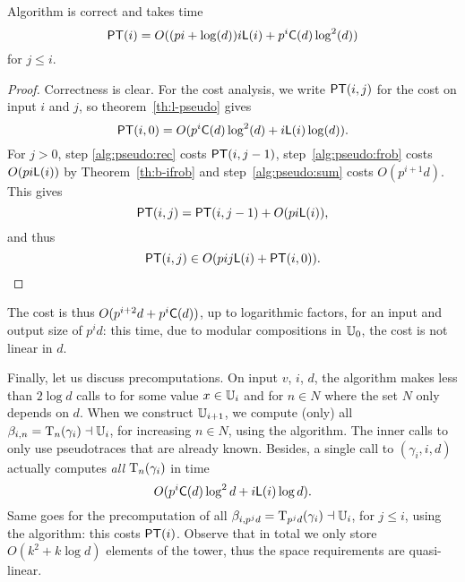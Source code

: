 \begin{theorem}
  \label{th:b-pseudo}
  Algorithm  is correct and takes time
  \begin{equation}
    \label{eq:97}
    \mathsf{PT}(i)=O((pi+\log (d))i\mathsf{L}(i)+p^i\mathsf{C}(d)\log^2 (d))    
  \end{equation}
  for $j \le
  i$.
\end{theorem}
\begin{proof}
  Correctness is clear. For the cost analysis, we write $\mathsf{PT}(i,j)$
  for the cost on input $i$ and $j$, so theorem~\ref{th:l-pseudo}
  gives 
  \begin{equation}
    \label{eq:101}
    \mathsf{PT}(i,0)=O(p^i\mathsf{C}(d)\log^2 (d) + i \mathsf{L}(i)\log(d))
    \text{.} 
  \end{equation}
  For $j>0$, step \ref{alg:pseudo:rec} costs $\mathsf{PT}(i,j-1)$,
  step~\ref{alg:pseudo:frob} costs $O(p i \mathsf{L}(i))$ by
  Theorem~\ref{th:b-ifrob} and step~\ref{alg:pseudo:sum} costs
  $O(p^{i+1}d)$. This gives 
  \begin{equation}
    \label{eq:102}
    \mathsf{PT}(i,j) = \mathsf{PT}(i,j-1) +O(p i \mathsf{L}(i))
    \text{,}
  \end{equation}
  and thus 
  \begin{equation}
    \label{eq:103}
    \mathsf{PT}(i,j) \in O(pij{\sf L}(i) + \mathsf{PT}(i,0))
    \text{.}
  \end{equation}
\end{proof}

The cost is thus $O(p^{i+2}d+p^i\mathsf{C}(d))$, up to logarithmic
factors, for an input and output size of $p^id$: this time, due to
modular compositions in $\mathbb{U}_0$, the cost is not linear in $d$.

Finally, let us discuss precomputations. On input $v$, $i$, $d$, the
algorithm  makes less than $2\log d$ calls to
 for some value $x\in\mathbb{U}_i$ and for
$n\in N$ where the set $N$ only depends on $d$. When we construct
$\mathbb{U}_{i+1}$, we compute (only) all $\beta_{i,n}=\operatorname{T}_{n}(\gamma_i)
\dashv\mathbb{U}_i$, for increasing $n\in N$, using the 
algorithm. The inner calls to  only use
pseudotraces that are already known. Besides, a single call to
$(\gamma_i,i,d)$ actually computes {\em all}
$\operatorname{T}_{n}(\gamma_i)$ in time 
\begin{equation}
  \label{eq:104}
  O(p^i\mathsf{C}(d)\log^2 d + i
  \mathsf{L}(i)\log d)
  \text{.}
\end{equation}
Same goes for the precomputation of all
$\beta_{i,p^jd}=\operatorname{T}_{p^jd}(\gamma_i) \dashv\mathbb{U}_i$, for $j\le i$, using
the  algorithm: this costs $\mathsf{PT}(i)$. Observe that in
total we only store $O(k^2 + k\log d)$ elements of the tower, thus the
space requirements are quasi-linear.

